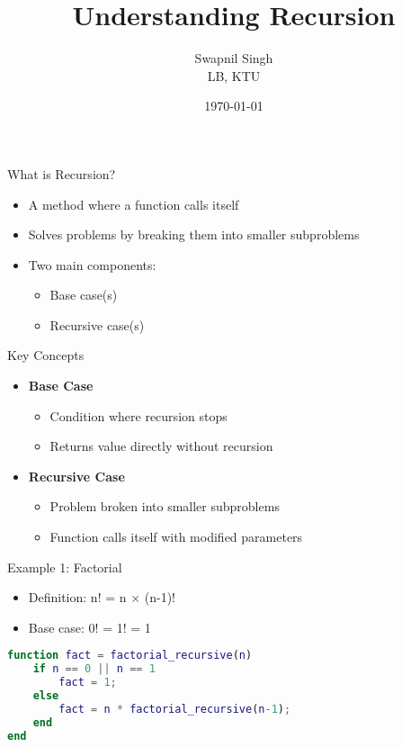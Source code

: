 \documentclass[10pt]{beamer}
\title{Understanding Recursion}
\author{Swapnil Singh\\ LB, KTU}
\date{\today}
\begin{document}
\maketitle

\begin{frame}{What is Recursion?}
    \begin{itemize}
        \item A method where a function calls itself
        \item Solves problems by breaking them into smaller subproblems
        \item Two main components:
        \begin{itemize}
            \item Base case(s)
            \item Recursive case(s)
        \end{itemize}
    \end{itemize}
\end{frame}

\begin{frame}{Key Concepts}
    \begin{itemize}
        \item \textbf{Base Case}
        \begin{itemize}
            \item Condition where recursion stops
            \item Returns value directly without recursion
        \end{itemize}
        \item \textbf{Recursive Case}
        \begin{itemize}
            \item Problem broken into smaller subproblems
            \item Function calls itself with modified parameters
        \end{itemize}
    \end{itemize}
\end{frame}

\begin{frame}[fragile]{Example 1: Factorial}
    \begin{itemize}
        \item Definition: n! = n × (n-1)!
        \item Base case: 0! = 1! = 1
    \end{itemize}
    \begin{lstlisting}[language=Matlab]
function fact = factorial_recursive(n)
    if n == 0 || n == 1
        fact = 1;
    else
        fact = n * factorial_recursive(n-1);
    end
end
    \end{lstlisting}
\end{frame}
\end{document}
